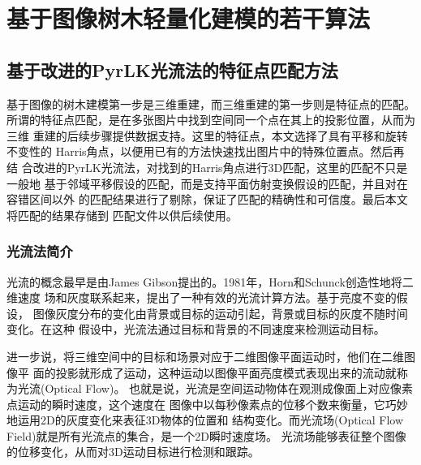 
\chapter{基于图像树木轻量化建模的若干算法}
\label{cha:algorithm}
\section{基于改进的PyrLK光流法的特征点匹配方法}
\label{sec:pyrlk}
基于图像的树木建模第一步是三维重建，而三维重建的第一步则是特征点的匹配。
所谓的特征点匹配，是在多张图片中找到空间同一个点在其上的投影位置，从而为三维
重建的后续步骤提供数据支持。这里的特征点，本文选择了具有平移和旋转不变性的
Harris角点，以便用已有的方法快速找出图片中的特殊位置点。然后再结
合改进的PyrLK光流法，对找到的Harris角点进行3D匹配，这里的匹配不只是一般地
基于邻域平移假设的匹配，而是支持平面仿射变换假设的匹配，并且对在容错区间以外
的匹配结果进行了剔除，保证了匹配的精确性和可信度。最后本文将匹配的结果存储到
匹配文件以供后续使用。

%

\subsection{光流法简介}
光流的概念最早是由James Gibson提出的。1981年，Horn和Schunck创造性地将二维速度
场和灰度联系起来，提出了一种有效的光流计算方法\cite{horn}。基于亮度不变的假设，
图像灰度分布的变化由背景或目标的运动引起，背景或目标的灰度不随时间变化。在这种
假设中，光流法通过目标和背景的不同速度来检测运动目标。

进一步说，将三维空间中的目标和场景对应于二维图像平面运动时，他们在二维图像平
面的投影就形成了运动，这种运动以图像平面亮度模式表现出来的流动就称为光流(Optical Flow)。
也就是说，光流是空间运动物体在观测成像面上对应像素点运动的瞬时速度，这个速度在
图像中以每秒像素点的位移个数来衡量，它巧妙地运用2D的灰度变化来表征3D物体的位置和
结构变化。而光流场(Optical Flow Field)就是所有光流点的集合，是一个2D瞬时速度场。
光流场能够表征整个图像的位移变化，从而对3D运动目标进行检测和跟踪。


